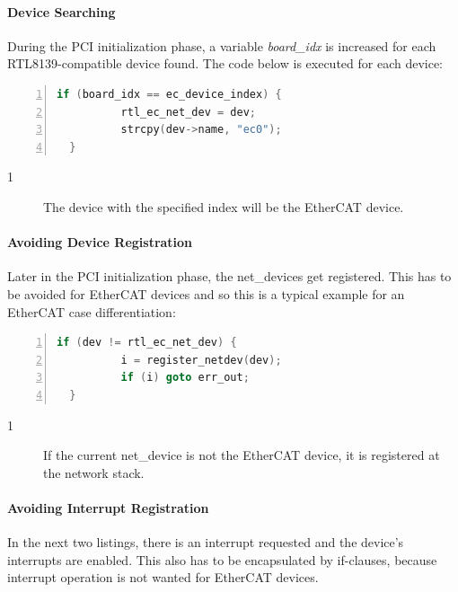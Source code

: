 \documentclass[a4paper,12pt,BCOR6mm,bibtotoc,idxtotoc]{scrbook}
\begin{document}
\paragraph{Device Searching}

During the PCI initialization phase, a variable \textit{board\_idx} is
increased for each RTL8139-compatible device found. The code below is
executed for each device:

\begin{lstlisting}[language=C,numbers=left]
  if (board_idx == ec_device_index) {
          rtl_ec_net_dev = dev;
          strcpy(dev->name, "ec0");
  }
\end{lstlisting}

\begin{description}
\item[\normalfont\textcircled{\tiny 1}] The device with the specified
  index will be the EtherCAT device.
\end{description}

\paragraph{Avoiding Device Registration}

Later in the PCI initialization phase, the net\_devices get
registered. This has to be avoided for EtherCAT devices and so this is
a typical example for an EtherCAT case differentiation:

\begin{lstlisting}[language=C,numbers=left]
  if (dev != rtl_ec_net_dev) {
          i = register_netdev(dev);
          if (i) goto err_out;
  }
\end{lstlisting}

\begin{description}
\item[\normalfont\textcircled{\tiny 1}] If the current net\_device is
  not the EtherCAT device, it is registered at the network stack.
\end{description}

\paragraph{Avoiding Interrupt Registration}

In the next two listings, there is an interrupt requested and the
device's interrupts are enabled. This also has to be encapsulated by
if-clauses, because interrupt operation is not wanted for EtherCAT
devices.
\end{document}

